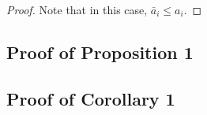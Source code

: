 \begin{proof}
Note that in this case, $\bar{a}_i \le a_i$.

\end{proof}





\subsection{Proof of Proposition 1}


\subsection{Proof of Corollary 1}



